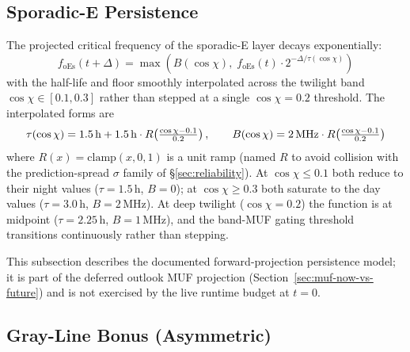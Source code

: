 \documentclass[11pt,a4paper]{article}
\newcommand{\SI}[2]{#1\,\text{#2}}
\newcommand{\MHz}{\text{MHz}}
\newcommand{\hour}{\text{h}}
\begin{document}
\subsection{Sporadic-E Persistence}\label{sec:espersistence}

The projected critical frequency of the sporadic-E layer decays
exponentially:
\begin{equation}\label{eq:es}
  f_{\text{oEs}}(t + \Delta) = \max\!\left(B(\cos\chi),\;
    f_{\text{oEs}}(t) \cdot 2^{-\Delta/\tau(\cos\chi)}\right)
\end{equation}
with the half-life and floor smoothly interpolated across the
twilight band $\cos\chi \in [0.1, 0.3]$ rather than stepped at a
single $\cos\chi = 0.2$ threshold.  The interpolated forms are
\begin{equation}
  \tau(\cos\chi) = \SI{1.5}{\hour} +
    \SI{1.5}{\hour}\cdot R\!\left(\tfrac{\cos\chi - 0.1}{0.2}\right),
  \qquad
  B(\cos\chi) = \SI{2}{\MHz}\cdot R\!\left(\tfrac{\cos\chi - 0.1}{0.2}\right)
\end{equation}
where $R(x) = \mathrm{clamp}(x, 0, 1)$ is a unit ramp (named
$R$ to avoid collision with
the prediction-spread $\sigma$ family of \S\ref{sec:reliability}).  At
$\cos\chi \le 0.1$ both reduce to their night values
($\tau = 1.5\,\text{h}$, $B = 0$); at $\cos\chi \ge 0.3$ both
saturate to the day values ($\tau = 3.0\,\text{h}$, $B = 2\,\text{MHz}$).
At deep twilight ($\cos\chi = 0.2$) the function is at midpoint
($\tau = 2.25\,\text{h}$, $B = 1\,\text{MHz}$), and the band-MUF
gating threshold transitions continuously rather than stepping.

This subsection describes the documented forward-projection
persistence model; it is part of the deferred outlook MUF
projection (Section~\ref{sec:muf-now-vs-future}) and is not
exercised by the live runtime budget at $t = 0$.

\subsection{Gray-Line Bonus (Asymmetric)}\label{sec:grayline}
\end{document}
